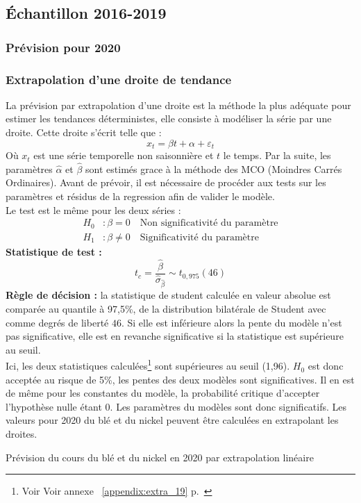 \subsection{Échantillon 2016-2019}\label{prev1}
\subsubsection{Prévision pour 2020}
\subsubsection*{Extrapolation d'une droite de tendance} 
La prévision par extrapolation d'une droite est la méthode la plus adéquate pour estimer les tendances déterministes, elle consiste à modéliser la série par une droite.
Cette droite s'écrit telle que :
\begin{equation*}
    x_{t} = \beta t + \alpha + \varepsilon_{t}
\end{equation*}
Où $x_{t}$ est une série temporelle non saisonnière et $t$ le temps. Par la suite, les paramètres $\hat{\alpha}$ et $\hat{\beta}$ sont estimés grace à la méthode des MCO 
(Moindres Carrés Ordinaires). Avant de prévoir, il est nécessaire de procéder aux tests sur les paramètres et résidus de la regression afin de valider le modèle.\\[11pt]
Le test est le même pour les deux séries :
\begin{equation*}
    \begin{split}
        H_{0} &: \beta = 0     \quad \text{Non significativité du paramètre} \\
        H_{1} &: \beta \neq 0  \quad \text{Significativité du paramètre}
    \end{split}
\end{equation*}
\textbf{Statistique de test :} 
\begin{equation*}
    t_{c} = \frac{\hat{\beta}}{\hat{\sigma}_{\hat{\beta}}}\sim t_{0,975}(46)
\end{equation*}
\textbf{Règle de décision :}  la statistique de student calculée en valeur absolue est comparée au quantile à 97,5\%, de la distribution bilatérale de Student avec comme 
degrés de liberté $46$. Si elle est inférieure alors la pente du modèle n'est pas significative, elle est en revanche significative si la statistique est 
supérieure au seuil.\\[11pt]
Ici, les deux statistiques calculées\footnote{Voir Voir annexe ~\ref{appendix:extra_19} p.~\pageref{appendix:extra_19}} sont 
supérieures au seuil (1,96). $H_{0}$ est donc acceptée au risque de 5\%, 
les pentes des deux modèles sont significatives. Il en est de même pour les constantes du modèle, la probabilité critique d'accepter l'hypothèse nulle étant 0. Les 
paramètres du modèles sont donc significatifs. Les valeurs pour 2020 du blé et du nickel peuvent être calculées en extrapolant les droites.
\begin{table}[H]
        \centering
        \caption{Prévision du cours du blé et du nickel en 2020 par extrapolation linéaire}
        \sffamily
        
\end{table}


